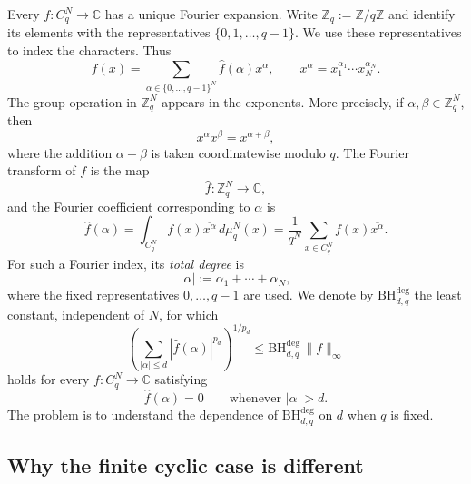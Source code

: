 \documentclass[11pt,a4paper]{article}
\numberwithin{equation}{section}
\theoremstyle{cleanplain}
\theoremstyle{cleandefinition}
\theoremstyle{cleanremark}
\newcommand{\C}{\mathbb C}
\newcommand{\BHdeg}[2]{\mathrm{BH}^{\mathrm{deg}}_{#1,#2}}
\begin{document}
Every $f:C_q^N\to\C$ has a unique Fourier expansion.  Write
$\mathbb Z_q:=\mathbb Z/q\mathbb Z$ and identify its elements with the
representatives $\{0,1,\ldots,q-1\}$.  We use these
representatives to index the characters.  Thus
\begin{equation}\label{eq:Fourier-intro}
 f(x)=\sum_{\alpha\in\{0,\ldots,q-1\}^N}
 \widehat f(\alpha)x^\alpha,
 \qquad
 x^\alpha=x_1^{\alpha_1}\cdots x_N^{\alpha_N}.
\end{equation}
The group operation in $\mathbb Z_q^N$ appears in the exponents.  More
precisely, if $\alpha,\beta\in\mathbb Z_q^N$, then
\begin{equation}\label{eq:mod-q-exponents-intro}
 x^\alpha x^\beta=x^{\alpha+\beta},
\end{equation}
where the addition $\alpha+\beta$ is taken coordinatewise modulo $q$.
The Fourier transform of $f$ is the map
\[
 \widehat f:\mathbb Z_q^N\longrightarrow\C,
\]
and the Fourier coefficient corresponding to $\alpha$ is
\begin{equation}\label{eq:Fourier-coeff-intro}
 \widehat f(\alpha)
 =\int_{C_q^N}f(x)\overline{x^\alpha}\,d\mu_q^N(x)
 =\frac1{q^N}\sum_{x\in C_q^N}f(x)\overline{x^\alpha}.
\end{equation}
For such a Fourier index, its \emph{total degree} is
\begin{equation}\label{eq:total-degree-intro}
 |\alpha|:=\alpha_1+\cdots+\alpha_N,
\end{equation}
where the fixed representatives $0,\ldots,q-1$ are used.  We denote by
$\BHdeg{d}{q}$ the least constant, independent of $N$, for which
\begin{equation}\label{eq:degree-BH-intro}
 \left(
 \sum_{|\alpha|\leq d}|\widehat f(\alpha)|^{p_d}
 \right)^{1/p_d}
 \leq \BHdeg{d}{q}\,\|f\|_\infty
\end{equation}
{\color{black}holds for every $f:C_q^N\to\C$ satisfying}
\begin{equation}\label{eq:degree-support-intro}
 \widehat f(\alpha)=0\qquad\text{whenever }|\alpha|>d.
\end{equation}
The problem is to understand the dependence of
$\BHdeg{d}{q}$ on $d$ when $q$ is fixed.

\subsection*{Why the finite cyclic case is different}
\end{document}
